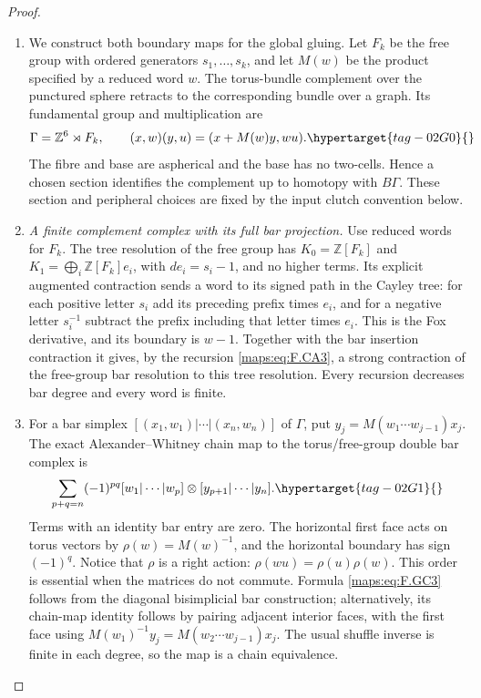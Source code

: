 \documentclass[11pt,a4paper]{article}
\numberwithin{equation}{section}
\theoremstyle{definition}
\begin{document}
\begin{proof}
\begin{enumerate}[label=\arabic*.]
\item We construct both boundary maps for the global gluing.  Let $F_k$ be the free group with ordered
generators $s_1,\ldots,s_k$, and let $M(w)$ be the product
specified by a reduced word $w$.  The torus-bundle complement
over the punctured sphere retracts to the corresponding bundle
over a graph.  Its fundamental group and multiplication are
\begin{equation}
 \Gamma=\mathbb Z^6\rtimes F_k,
 \qquad (x,w)(y,u)=(x+M(w)y,wu).                            \hypertarget{tag-02G0}{}\label{maps:eq:F.GC2}
\end{equation}
The fibre and base are aspherical and the base has no
two-cells.  Hence a chosen section identifies the complement
up to homotopy with $B\Gamma$.  These section and peripheral
choices are fixed by the input clutch convention below.

\item \emph{A finite complement complex with its full bar projection.}
Use reduced words for $F_k$.  The tree resolution of the free
group has $K_0=\mathbb Z[F_k]$ and
$K_1=\bigoplus_i\mathbb Z[F_k]e_i$, with
$de_i=s_i-1$, and no higher terms.  Its explicit augmented
contraction sends a word to its signed path in the Cayley
tree: for each positive letter $s_i$ add its preceding prefix
times $e_i$, and for a negative letter $s_i^{-1}$ subtract
the prefix including that letter times $e_i$.
This is the Fox derivative, and its boundary is $w-1$.
Together with the bar insertion contraction it gives, by
the recursion \eqref{maps:eq:F.CA3}, a strong contraction of the free-group
bar resolution to this tree resolution.  Every recursion
decreases bar degree and every word is finite.

\item For a bar simplex $[(x_1,w_1)|\cdots|(x_n,w_n)]$ of $\Gamma$,
put $y_j=M(w_1\cdots w_{j-1})x_j$.
The exact Alexander--Whitney chain map to the torus/free-group
double bar complex is
\begin{equation}
 \sum_{p+q=n}(-1)^{pq}
 [w_1|\cdots|w_p]\otimes[y_{p+1}|\cdots|y_n].              \hypertarget{tag-02G1}{}\label{maps:eq:F.GC3}
\end{equation}
Terms with an identity bar entry are zero.  The horizontal
first face acts on torus vectors by
$\rho(w)=M(w)^{-1}$, and the horizontal boundary has sign
$(-1)^q$.  Notice that $\rho$ is a right action:
$\rho(wu)=\rho(u)\rho(w)$.  This order is essential when
the matrices do not commute.  Formula \eqref{maps:eq:F.GC3} follows from
the diagonal bisimplicial bar construction; alternatively,
its chain-map identity follows by pairing adjacent interior
faces, with the first face using
$M(w_1)^{-1}y_j=M(w_2\cdots w_{j-1})x_j$.
The usual shuffle inverse is finite in each degree, so the
map is a chain equivalence.


\end{enumerate}
\end{proof}
\end{document}
